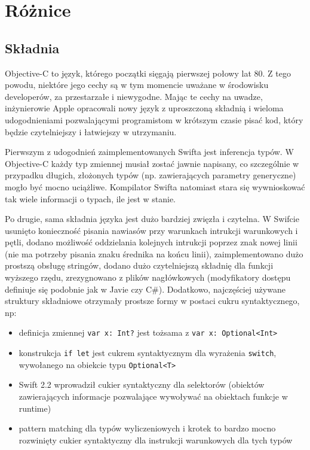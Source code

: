 \documentclass[mgr, shortabstract]{iithesis}
\begin{document}
\section{Różnice}

\subsection{Składnia}

Objective-C to język, którego początki sięgają pierwszej połowy lat 80. Z tego powodu, niektóre jego cechy są w tym momencie uważane w środowisku developerów, za przestarzałe i niewygodne. Mając te cechy na uwadze, inżynierowie Apple opracowali nowy język z uproszczoną składnią i wieloma udogodnieniami pozwalającymi programistom w krótszym czasie pisać kod, który będzie czytelniejszy i łatwiejszy w utrzymaniu.

Pierwszym z udogodnień zaimplementowanych Swifta jest inferencja typów. W Objective-C każdy typ zmiennej musiał zostać jawnie napisany, co szczególnie w przypadku długich, złożonych typów (np. zawierających parametry generyczne) mogło być mocno uciążliwe. Kompilator Swifta natomiast stara się wywnioskować tak wiele informacji o typach, ile jest w stanie.

Po drugie, sama składnia języka jest dużo bardziej zwięzła i czytelna. W Swifcie usunięto konieczność pisania nawiasów przy warunkach intrukcji warunkowych i pętli, dodano możliwość oddzielania kolejnych intrukcji poprzez znak nowej linii (nie ma potrzeby pisania znaku średnika na końcu linii), zaimplementowano dużo prostszą obsługę stringów, dodano dużo czytelniejszą składnię dla funkcji wyższego rzędu, zrezygnowano z plików nagłówkowych (modyfikatory dostępu definiuje się podobnie jak w Javie czy C\#). Dodatkowo, najczęściej używane struktury składniowe otrzymały prostsze formy w postaci cukru syntaktycznego, np:

\begin{itemize}
    \item definicja zmiennej \texttt{var x: Int?} jest tożsama z \texttt{var x: Optional<Int>}
    \item konstrukcja \texttt{if let} jest cukrem syntaktycznym dla wyrażenia \texttt{switch}, wywołanego na obiekcie typu \texttt{Optional<T>}
    \item Swift 2.2 wprowadził cukier syntaktyczny dla selektorów (obiektów zawierających informacje pozwalające wywoływać na obiektach funkcje w runtime)
    \item pattern matching dla typów wyliczeniowych i krotek to bardzo mocno rozwinięty cukier syntaktyczny dla instrukcji warunkowych dla tych typów
\end{itemize}
\end{document}
